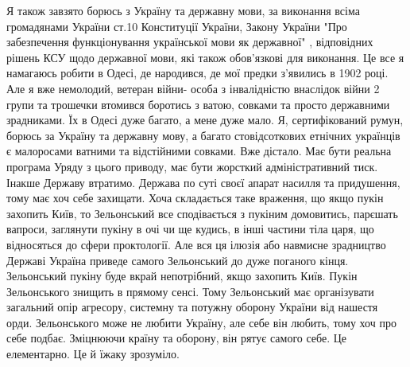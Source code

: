 \begin{itemize}
Я також завзято борюсь з Україну та державну мови, за виконання всіма
громадянами України ст.10 Конституції України, Закону України "Про забезпечення
функціонування української мови як державної" , відповідних рішень КСУ щодо
державної мови, які також обов'язкові для виконання. Це все я намагаюсь робити
в Одесі, де народився, де мої предки з'явились в 1902 році. Але я вже
немолодий, ветеран війни- особа з інвалідністю внаслідок війни 2 групи та
трошечки втомився боротись з ватою, совками та просто державними зрадниками. Їх
в Одесі дуже багато, а мене дуже мало. Я, сертифікований румун, борюсь за
Україну та державну мову, а багато стовідсоткових етнічних українців є
малоросами ватними та відстійними совками. Вже дістало. Має бути реальна
програма Уряду з цього приводу, має бути жорсткий адміністративний тиск. Інакше
Державу втратимо. Держава по суті своєї апарат насилля та придушення, тому має
хоч себе захищати. Хоча складається таке враження, що якщо пукін захопить Київ,
то Зельонський все сподівається з пукіним домовитись, парєшать вапроси,
заглянути пукіну в очі чи ще кудись, в інші частини тіла царя, що відносяться
до сфери проктології. Але вся ця ілюзія або навмисне зрадництво Державі Україна
приведе самого Зельонський до дуже поганого кінця. Зельонський пукіну буде
вкрай непотрібний, якщо захопить Київ. Пукін Зельонського знищить в прямому
сенсі. Тому Зельонський має організувати загальний опір агресору, системну та
потужну оборону України від нашестя орди. Зельонського може не любити Україну,
але себе він любить, тому хоч про себе подбає. Зміцнюючи країну та оборону, він
рятує самого себе. Це елементарно. Це й їжаку зрозуміло.
\end{itemize}

